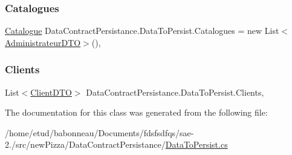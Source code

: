 \mbox{\label{classDataContractPersistance_1_1DataToPersist_a354d03aae2166a6a3e0f05f36cd8f1d8}} 
\subsubsection{\texorpdfstring{Catalogues}{Catalogues}}
{\footnotesize\ttfamily \hyperlink{classModele_1_1Catalogue}{Catalogue} Data\+Contract\+Persistance.\+Data\+To\+Persist.\+Catalogues = new List$<$\hyperlink{classDataContractPersistance_1_1AdministrateurDTO}{Administrateur\+D\+TO}$>$()\hspace{0.3cm}{\ttfamily [get]}, {\ttfamily [set]}}

\mbox{\label{classDataContractPersistance_1_1DataToPersist_a325374374f5828185f08e8cda75155ac}} 
\subsubsection{\texorpdfstring{Clients}{Clients}}
{\footnotesize\ttfamily List$<$\hyperlink{classDataContractPersistance_1_1ClientDTO}{Client\+D\+TO}$>$ Data\+Contract\+Persistance.\+Data\+To\+Persist.\+Clients\hspace{0.3cm}{\ttfamily [get]}, {\ttfamily [set]}}



The documentation for this class was generated from the following file\+:\begin{DoxyCompactItemize}
\item 
/home/etud/babonneau/\+Documents/fdsfsdfqs/sae-\/2./src/new\+Pizza/\+Data\+Contract\+Persistance/\hyperlink{DataToPersist_8cs}{Data\+To\+Persist.\+cs}\end{DoxyCompactItemize}
